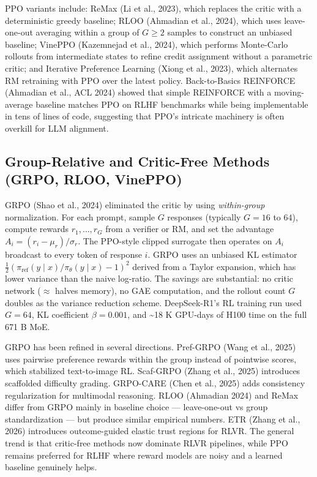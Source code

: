 PPO variants include: ReMax (Li et al., 2023), which replaces the critic with a deterministic greedy baseline; RLOO (Ahmadian et al., 2024), which uses leave-one-out averaging within a group of \(G \ge 2\) samples to construct an unbiased baseline; VinePPO (Kazemnejad et al., 2024), which performs Monte-Carlo rollouts from intermediate states to refine credit assignment without a parametric critic; and Iterative Preference Learning (Xiong et al., 2023), which alternates RM retraining with PPO over the latest policy. Back-to-Basics REINFORCE (Ahmadian et al., ACL 2024) showed that simple REINFORCE with a moving-average baseline matches PPO on RLHF benchmarks while being implementable in tens of lines of code, suggesting that PPO's intricate machinery is often overkill for LLM alignment.

\subsection{Group-Relative and Critic-Free Methods (GRPO, RLOO, VinePPO)}\label{group-relative-and-critic-free-methods-grpo-rloo-vineppo}

GRPO (Shao et al., 2024) eliminated the critic by using \emph{within-group} normalization. For each prompt, sample \(G\) responses (typically \(G = 16\) to \(64\)), compute rewards \(r_1, \ldots, r_G\) from a verifier or RM, and set the advantage \(A_i = (r_i - \mu_r)/\sigma_r\). The PPO-style clipped surrogate then operates on \(A_i\) broadcast to every token of response \(i\). GRPO uses an unbiased KL estimator \(\tfrac{1}{2}(\pi_{\text{ref}}(y\mid x)/\pi_\theta(y\mid x) - 1)^2\) derived from a Taylor expansion, which has lower variance than the naive log-ratio. The savings are substantial: no critic network (\(\approx\) halves memory), no GAE computation, and the rollout count \(G\) doubles as the variance reduction scheme. DeepSeek-R1's RL training run used \(G = 64\), KL coefficient \(\beta = 0.001\), and \textasciitilde18 K GPU-days of H100 time on the full 671 B MoE.

GRPO has been refined in several directions. Pref-GRPO (Wang et al., 2025) uses pairwise preference rewards within the group instead of pointwise scores, which stabilized text-to-image RL. Scaf-GRPO (Zhang et al., 2025) introduces scaffolded difficulty grading. GRPO-CARE (Chen et al., 2025) adds consistency regularization for multimodal reasoning. RLOO (Ahmadian 2024) and ReMax differ from GRPO mainly in baseline choice --- leave-one-out vs group standardization --- but produce similar empirical numbers. ETR (Zhang et al., 2026) introduces outcome-guided elastic trust regions for RLVR. The general trend is that critic-free methods now dominate RLVR pipelines, while PPO remains preferred for RLHF where reward models are noisy and a learned baseline genuinely helps.

